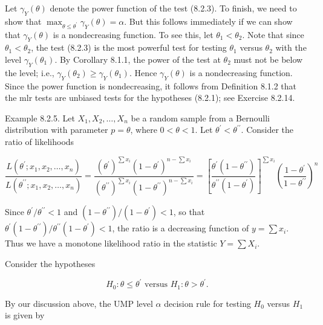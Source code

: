 Let $\gamma_{Y}(\theta)$ denote the power function of the test (8.2.3). To finish, we need to show that $\max _{\theta \leq \theta^{\prime}} \gamma_{Y}(\theta)=\alpha$. But this follows immediately if we can show that $\gamma_{Y}(\theta)$ is a nondecreasing function. To see this, let $\theta_{1}<\theta_{2}$. Note that since $\theta_{1}<\theta_{2}$, the test (8.2.3) is the most powerful test for testing $\theta_{1}$ versus $\theta_{2}$ with the level $\gamma_{Y}\left(\theta_{1}\right)$. By Corollary 8.1.1, the power of the test at $\theta_{2}$ must not be below the level; i.e., $\gamma_{Y}\left(\theta_{2}\right) \geq \gamma_{Y}\left(\theta_{1}\right)$. Hence $\gamma_{Y}(\theta)$ is a nondecreasing function. Since the power function is nondecreasing, it follows from Definition 8.1.2 that the mlr tests are unbiased tests for the hypotheses (8.2.1); see Exercise 8.2.14.

Example 8.2.5. Let $X_{1}, X_{2}, \ldots, X_{n}$ be a random sample from a Bernoulli distribution with parameter $p=\theta$, where $0<\theta<1$. Let $\theta^{\prime}<\theta^{\prime \prime}$. Consider the ratio of likelihoods

$$
\frac{L\left(\theta^{\prime} ; x_{1}, x_{2}, \ldots, x_{n}\right)}{L\left(\theta^{\prime \prime} ; x_{1}, x_{2}, \ldots, x_{n}\right)}=\frac{\left(\theta^{\prime}\right)^{\sum x_{i}}\left(1-\theta^{\prime}\right)^{n-\sum x_{i}}}{\left(\theta^{\prime \prime}\right)^{\sum x_{i}}\left(1-\theta^{\prime \prime}\right)^{n-\sum x_{i}}}=\left[\frac{\theta^{\prime}\left(1-\theta^{\prime \prime}\right)}{\theta^{\prime \prime}\left(1-\theta^{\prime}\right)}\right]^{\sum x_{i}}\left(\frac{1-\theta^{\prime}}{1-\theta^{\prime \prime}}\right)^{n}
$$

Since $\theta^{\prime} / \theta^{\prime \prime}<1$ and $\left(1-\theta^{\prime \prime}\right) /\left(1-\theta^{\prime}\right)<1$, so that $\theta^{\prime}\left(1-\theta^{\prime \prime}\right) / \theta^{\prime \prime}\left(1-\theta^{\prime}\right)<1$, the ratio is a decreasing function of $y=\sum x_{i}$. Thus we have a monotone likelihood ratio in the statistic $Y=\sum X_{i}$.

Consider the hypotheses


\begin{equation*}
H_{0}: \theta \leq \theta^{\prime} \text { versus } H_{1}: \theta>\theta^{\prime} . \tag{8.2.4}
\end{equation*}


By our discussion above, the UMP level $\alpha$ decision rule for testing $H_{0}$ versus $H_{1}$ is given by

